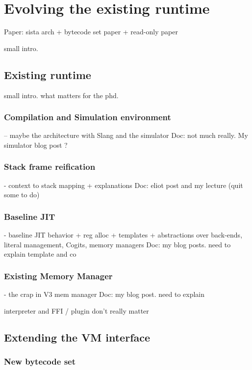 \documentclass[a4paper,12pt,twoside]{../includes/ThesisStyle}
\begin{document}
\fi

\chapter{Evolving the existing runtime}
\label{chap:archImpl}
\minitoc

Paper: sista arch + bytecode set paper + read-only paper

small intro. 

\section{Existing runtime}

small intro. what matters for the phd. 

\subsection{Compilation and Simulation environment}
-- maybe the architecture with Slang and the simulator
Doc: not much really. My simulator blog post ?

\subsection{Stack frame reification}
- context to stack mapping + explanations
Doc: eliot post and my lecture (quit some to do)

\subsection{Baseline JIT}
- baseline JIT behavior + reg alloc + templates + abstractions over back-ends, literal management, Cogits, memory managers
Doc: my blog posts. need to explain template and co

\subsection{Existing Memory Manager}
- the crap in V3 mem manager
Doc: my blog post. need to explain

interpreter and FFI / plugin don't really matter

\section{Extending the VM interface}

\subsection{New bytecode set}
\end{document}
